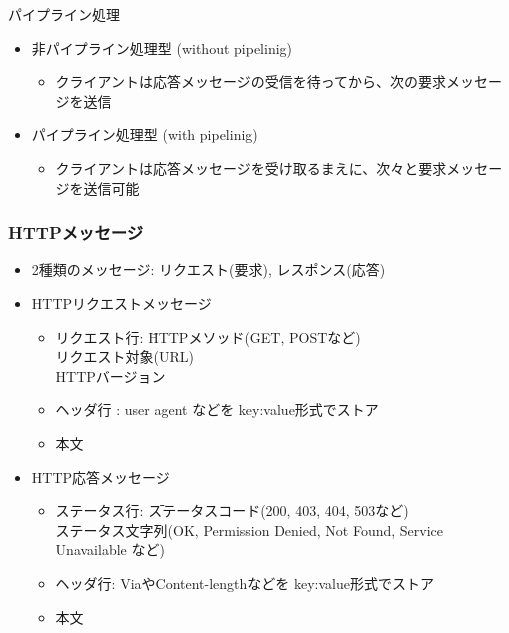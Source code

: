 パイプライン処理
\begin{itemize}
  \item 非パイプライン処理型 (without pipelinig)
  \begin{itemize}
    \item クライアントは応答メッセージの受信を待ってから、次の要求メッセージを送信
  \end{itemize}
  \item パイプライン処理型 (with pipelinig)
  \begin{itemize}
    \item クライアントは応答メッセージを受け取るまえに、次々と要求メッセージを送信可能
  \end{itemize}
\end{itemize}

\subsubsection{HTTPメッセージ}

\begin{itemize}
  \item 2種類のメッセージ: リクエスト(要求), レスポンス(応答)
  \item HTTPリクエストメッセージ
  \begin{itemize}
    \item \begin{tabbing}
      リクエスト行: \=HTTPメソッド(GET, POSTなど)\\
      \>リクエスト対象(URL) \\
      \>HTTPバージョン
    \end{tabbing}
    \item ヘッダ行   : user agent などを key:value形式でストア
    \item 本文
  \end{itemize}
  \item HTTP応答メッセージ
  \begin{itemize}
    \item \begin{tabbing}
      ステータス行: \=ステータスコード(200, 403, 404, 503など)\\
      \> ステータス文字列(OK, Permission Denied, Not Found, Service Unavailable など)
    \end{tabbing}
    \item ヘッダ行: ViaやContent-lengthなどを key:value形式でストア
    \item 本文
  \end{itemize}
\end{itemize}
